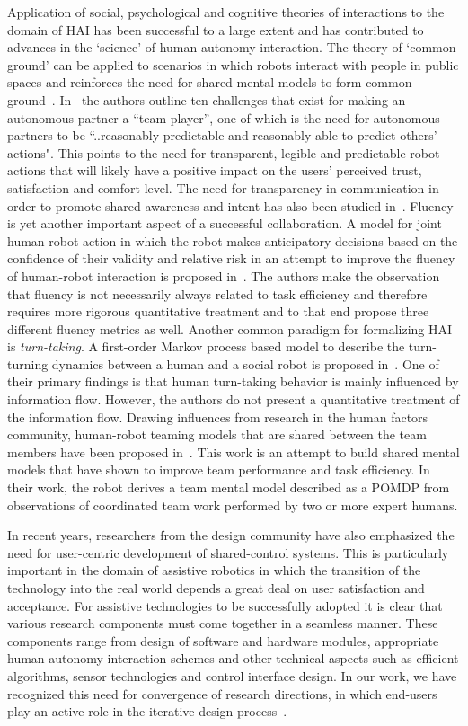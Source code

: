 \documentclass[12pt]{article}
\begin{document}
Application of social, psychological and cognitive theories of interactions to the domain of HAI has been successful to a large extent and has contributed to advances in the `science' of human-autonomy interaction. The theory of `common ground' can be applied to scenarios in which robots interact with people in public spaces and reinforces the need for shared mental models to form common ground~\cite{kiesler2005fostering}. In~\cite{klien2004ten} the authors outline ten challenges that exist for making an autonomous partner a ``team player'', one of which is the need for autonomous partners to be ``..reasonably predictable and reasonably able to predict others' actions". This points to the need for transparent, legible and predictable robot actions that will likely have a positive impact on the users' perceived trust, satisfaction and comfort level. The need for transparency in communication in order to promote shared awareness and intent has also been studied in~\cite{lyons2014transparency}. Fluency is yet another important aspect of a successful collaboration. A model for joint human robot action in which the robot makes anticipatory decisions based on the confidence of their validity and relative risk in an attempt to improve the fluency of human-robot interaction is proposed in~\cite{hoffman2007cost}. The authors make the observation that fluency is not necessarily always related to task efficiency and therefore requires more rigorous quantitative treatment and to that end propose three different fluency metrics as well. Another common paradigm for formalizing HAI is \textit{turn-taking}. A first-order Markov process based model to describe the turn-turning dynamics between a human and a social robot is proposed in~\cite{thomaz2011turn}. One of their primary findings is that human turn-taking behavior is mainly influenced by information flow. However, the authors do not present a quantitative treatment of the information flow. Drawing influences from research in the human factors community, human-robot teaming models that are shared between the team members have been proposed in~\cite{nikolaidis2012human}. This work is an attempt to build shared mental models that have shown to improve team performance and task efficiency. In their work, the robot derives a team mental model described as a POMDP from observations of coordinated team work performed by two or more expert humans. 

In recent years, researchers from the design community have also emphasized the need for user-centric development of shared-control systems. This is particularly important in the domain of assistive robotics in which the transition of the technology into the real world depends a great deal on user satisfaction and acceptance. For assistive technologies to be successfully adopted it is clear that various research components must come together in a seamless manner. These components range from design of software and hardware modules, appropriate human-autonomy interaction schemes and other technical aspects such as efficient algorithms, sensor technologies and control interface design. In our work, we have recognized this need for convergence of research directions, in which end-users play an active role in the iterative design process~\cite{egli2016call}. 
\end{document}
